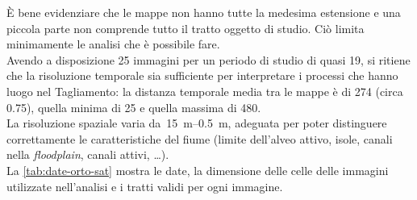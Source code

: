 È bene evidenziare che le mappe non hanno tutte la medesima estensione e una piccola parte non comprende tutto il tratto oggetto di studio.
Ciò limita minimamente le analisi che è possibile fare.
\\
Avendo a disposizione 25 immagini per un periodo di studio di quasi \SI{19}{\anni},  si ritiene che la risoluzione temporale sia sufficiente per interpretare i processi che hanno luogo nel Tagliamento: la distanza temporale media tra le mappe è di \SI{274}{\giorni} (circa \SI{0.75}{\anni}), quella minima di \SI{25}{\giorni} e quella massima di \SI{480}{\giorni}.
\\
La risoluzione spaziale varia da~\SIrange[range-phrase={ a }]{15}{0.5}{\m}, adeguata per poter distinguere correttamente le caratteristiche del fiume (limite dell'alveo attivo, isole, canali nella \emph{floodplain}, canali attivi, \ldots).
\\
La \cref{tab:date-orto-sat} mostra le date, la dimensione delle celle delle immagini utilizzate nell'analisi e i tratti validi per ogni immagine.
